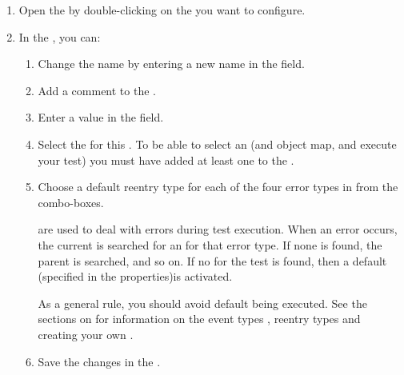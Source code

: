 \begin{enumerate}
\item Open the \gdtestsuiteeditor{} by double-clicking on the \gdsuite{} you want to configure. 
\item In the \gdpropview{}, you can:
\begin{enumerate}
\item Change the \gdsuite{} name by entering a new name in the  field.  
\item Add a comment to the \gdsuite{} . 
\item Enter a value in the  field. 


\item Select the \gdaut{} for this \gdsuite{}. To be able to select an \gdaut{} (and object map, and execute your test) you must have added at least one \gdaut{} to the \gdproject{} .




\item Choose a default reentry type for each of the four error types in \app{} from the combo-boxes. 

\gdehandlers{} are \gdcases{} used to deal with errors during test execution. When an error occurs, the current \gdcase{} is searched for an \gdehandler{} for that error type. If none is found, the parent \gdcase{} is searched, and so on. If no \gdehandler{} for the test is found, then a default \gdehandler{} (specified in the \gdsuite{} properties)is activated.  

As a general rule, you should avoid default \gdehandlers{} being executed.
See the sections on \gdehandlers{} for information on the event types , reentry types  and creating your own \gdehandlers{}.
\item Save the changes in the \gdtestsuiteeditor{}.
\end{enumerate}
\end{enumerate}
